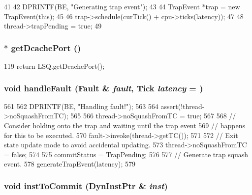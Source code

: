 \begin{DoxyCode}
41 {
42     DPRINTF(BE, "Generating trap event\n");
43 
44     TrapEvent *trap = new TrapEvent(this);
45 
46     trap->schedule(curTick() + cpu->ticks(latency));
47 
48     thread->trapPending = true;
49 }
\end{DoxyCode}
\hypertarget{classLWBackEnd_a32e64f82b805fe23a17b01dda0f44fb0}{
\subsubsection[{getDcachePort}]{$\ast$ getDcachePort ()}}
\label{classLWBackEnd_a32e64f82b805fe23a17b01dda0f44fb0}



\begin{DoxyCode}
119 { return LSQ.getDcachePort(); }
\end{DoxyCode}
\hypertarget{classLWBackEnd_af3d02b2950c0aaa8cd71d422abd0ef51}{
\subsubsection[{handleFault}]{\setlength{\rightskip}{0pt plus 5cm}void handleFault ({\bf Fault} \& {\em fault}, \/  {\bf Tick} {\em latency} = {})}}
\label{classLWBackEnd_af3d02b2950c0aaa8cd71d422abd0ef51}



\begin{DoxyCode}
561 {
562     DPRINTF(BE, "Handling fault!\n");
563 
564     assert(!thread->noSquashFromTC);
565 
566     thread->noSquashFromTC = true;
567 
568     // Consider holding onto the trap and waiting until the trap event
569     // happens for this to be executed.
570     fault->invoke(thread->getTC());
571 
572     // Exit state update mode to avoid accidental updating.
573     thread->noSquashFromTC = false;
574 
575     commitStatus = TrapPending;
576 
577     // Generate trap squash event.
578     generateTrapEvent(latency);
579 }
\end{DoxyCode}
\hypertarget{classLWBackEnd_a720e9865ffa6e84b756f5ec1d1a24d94}{
\subsubsection[{instToCommit}]{\setlength{\rightskip}{0pt plus 5cm}void instToCommit ({\bf DynInstPtr} \& {\em inst})}}
\label{classLWBackEnd_a720e9865ffa6e84b756f5ec1d1a24d94}



